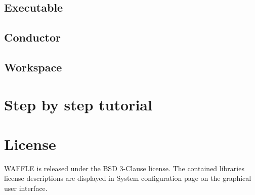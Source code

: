 \documentclass[a4paper]{article}
\begin{document}
\subsection{Executable}
\subsection{Conductor}
\subsection{Workspace}

\section{Step by step tutorial}

\section{License}
WAFFLE is released under the BSD 3-Clause license.
The contained libraries license descriptions are displayed in System configuration page on the graphical user interface.
\end{document}
